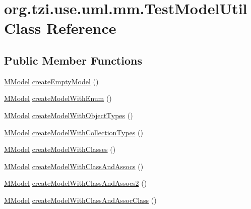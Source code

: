 \hypertarget{classorg_1_1tzi_1_1use_1_1uml_1_1mm_1_1_test_model_util}{\section{org.\-tzi.\-use.\-uml.\-mm.\-Test\-Model\-Util Class Reference}
\label{classorg_1_1tzi_1_1use_1_1uml_1_1mm_1_1_test_model_util}
}
\subsection*{Public Member Functions}
\begin{DoxyCompactItemize}
\item 
\hyperlink{classorg_1_1tzi_1_1use_1_1uml_1_1mm_1_1_m_model}{M\-Model} \hyperlink{classorg_1_1tzi_1_1use_1_1uml_1_1mm_1_1_test_model_util_adc0cdb5b9489d5ee559a1e658d46e3e8}{create\-Empty\-Model} ()
\item 
\hyperlink{classorg_1_1tzi_1_1use_1_1uml_1_1mm_1_1_m_model}{M\-Model} \hyperlink{classorg_1_1tzi_1_1use_1_1uml_1_1mm_1_1_test_model_util_ac61853c4a6ccce25fa2b30c5032cbb6a}{create\-Model\-With\-Enum} ()
\item 
\hyperlink{classorg_1_1tzi_1_1use_1_1uml_1_1mm_1_1_m_model}{M\-Model} \hyperlink{classorg_1_1tzi_1_1use_1_1uml_1_1mm_1_1_test_model_util_adbfed7dfd4805b5bcc538f8a1011d5fc}{create\-Model\-With\-Object\-Types} ()
\item 
\hyperlink{classorg_1_1tzi_1_1use_1_1uml_1_1mm_1_1_m_model}{M\-Model} \hyperlink{classorg_1_1tzi_1_1use_1_1uml_1_1mm_1_1_test_model_util_a65245c5d70d728f37d65474dd3e5cc14}{create\-Model\-With\-Collection\-Types} ()
\item 
\hyperlink{classorg_1_1tzi_1_1use_1_1uml_1_1mm_1_1_m_model}{M\-Model} \hyperlink{classorg_1_1tzi_1_1use_1_1uml_1_1mm_1_1_test_model_util_aaae52e48fa7ceac03774728b79edd28c}{create\-Model\-With\-Classes} ()
\item 
\hyperlink{classorg_1_1tzi_1_1use_1_1uml_1_1mm_1_1_m_model}{M\-Model} \hyperlink{classorg_1_1tzi_1_1use_1_1uml_1_1mm_1_1_test_model_util_a0cb51ac9fe7b7ff66e2fda28e0c160e7}{create\-Model\-With\-Class\-And\-Assocs} ()
\item 
\hyperlink{classorg_1_1tzi_1_1use_1_1uml_1_1mm_1_1_m_model}{M\-Model} \hyperlink{classorg_1_1tzi_1_1use_1_1uml_1_1mm_1_1_test_model_util_a145adc8a0bf395bf53292d7ba65ab0f9}{create\-Model\-With\-Class\-And\-Assocs2} ()
\item 
\hyperlink{classorg_1_1tzi_1_1use_1_1uml_1_1mm_1_1_m_model}{M\-Model} \hyperlink{classorg_1_1tzi_1_1use_1_1uml_1_1mm_1_1_test_model_util_af10b841bfeb2903aa4b8f3944620ede0}{create\-Model\-With\-Class\-And\-Assoc\-Class} ()

\end{DoxyCompactItemize}
